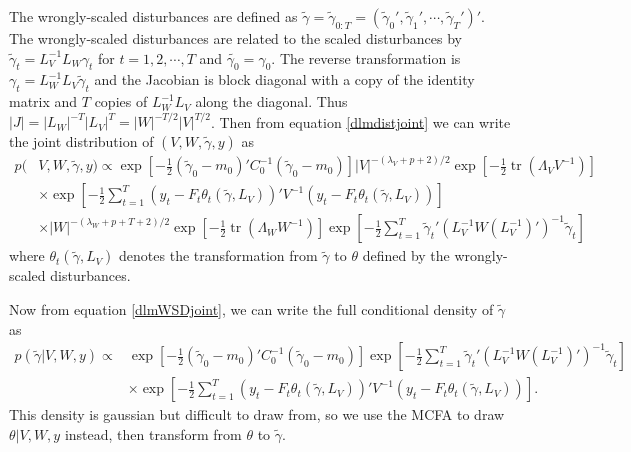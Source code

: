 \documentclass{article}
\DeclareMathOperator{\tr}{tr}
\begin{document}
The wrongly-scaled disturbances are defined as  $\tilde{\gamma}=\tilde{\gamma}_{0:T}=(\tilde{\gamma}_0',\tilde{\gamma}_1',\cdots,\tilde{\gamma}_T')'$. The wrongly-scaled disturbances are related to the scaled disturbances by $\tilde{\gamma}_t = L_V^{-1}L_W\gamma_t$ for $t=1,2,\cdots,T$ and $\tilde{\gamma_0}=\gamma_0$. The reverse transformation is $\gamma_t = L_W^{-1}L_V\tilde{\gamma}_t$ and the Jacobian is block diagonal with a copy of the identity matrix and $T$ copies of $L_W^{-1}L_V$ along the diagonal. Thus $|J|=|L_W|^{-T}|L_V|^T=|W|^{-T/2}|V|^{T/2}$. Then from equation \eqref{dlmdistjoint} we can write the joint distribution of $(V,W,\tilde{\gamma},y)$ as
 \begin{align}
  p(&V,W,\tilde{\gamma},y) \propto \exp\left[-\frac{1}{2}(\tilde{\gamma}_0-m_0)'C_0^{-1}(\tilde{\gamma}_0-m_0)\right] |V|^{-(\lambda_V + p + 2)/2}\exp\left[-\frac{1}{2}\tr\left(\Lambda_VV^{-1}\right)\right]  \nonumber\\
  &\times  \exp\left[-\frac{1}{2}\sum_{t=1}^T\left(y_t - F_t\theta_t(\tilde{\gamma},L_V)\right)'V^{-1}\left(y_t - F_t\theta_t(\tilde{\gamma},L_V)\right)\right]\nonumber\\
   & \times |W|^{-(\lambda_W + p + T + 2)/2}\exp\left[-\frac{1}{2}\tr\left(\Lambda_WW^{-1}\right)\right] \exp\left[-\frac{1}{2}\sum_{t=1}^T\tilde{\gamma}_t'(L_V^{-1}W(L_V^{-1})')^{-1}\tilde{\gamma}_t\right]\label{dlmWSDjoint}
 \end{align}
where $\theta_t(\tilde{\gamma},L_V)$ denotes the transformation from $\tilde{\gamma}$ to $\theta$ defined by the wrongly-scaled disturbances. 

Now from equation \eqref{dlmWSDjoint}, we can write the full conditional density of $\tilde{\gamma}$ as 
\begin{align*}
p(\tilde{\gamma}|V,W,y) \propto & \exp\left[-\frac{1}{2}(\tilde{\gamma}_0-m_0)'C_0^{-1}(\tilde{\gamma}_0-m_0)\right]  \exp\left[-\frac{1}{2}\sum_{t=1}^T\tilde{\gamma}_t'(L_V^{-1}W(L_V^{-1})')^{-1}\tilde{\gamma}_t\right]\\
   &\times  \exp\left[-\frac{1}{2}\sum_{t=1}^T\left(y_t - F_t\theta_t(\tilde{\gamma},L_V)\right)'V^{-1}\left(y_t - F_t\theta_t(\tilde{\gamma},L_V)\right)\right].
\end{align*}
This density is gaussian but difficult to draw from, so we use the MCFA to draw $\theta|V,W,y$ instead, then transform from $\theta$ to $\tilde{\gamma}$.
\end{document}
